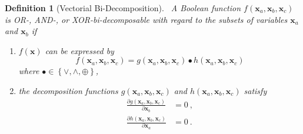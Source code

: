 \documentclass[a4paper]{article}
\newtheorem{definition}{Definition}
\newcommand\bx{\mathbf{x}}
\begin{document}
\begin{definition}[Vectorial Bi-Decomposition]$\, $
\label{def:vbd}
\newline
A Boolean function $f(\bx_a,\bx_b,\bx_c)$
is OR-, AND-, or XOR-bi-decomposable with regard to the subsets of variables $\bx_a$ and $\bx_b$  
if 
\begin{enumerate}
	\item $f(\bx)$ can be expressed by
\begin{equation}
f(\bx_a,\bx_b,\bx_c)=g(\bx_a,\bx_b,\bx_c) \bullet h(\bx_a,\bx_b,\bx_c)
 \label{equ:def_vobd}
\end{equation}
where $\bullet \in \left\{ \vee, \wedge, \oplus \right\}$,
	\item the decomposition functions 
$g(\bx_a,\bx_b,\bx_c)$ and $h(\bx_a,\bx_b,\bx_c)$ satisfy 
\begin{align}
\frac{\partial g(\bx_a,\bx_b,\bx_c)}{\partial \bx_b} &= 0~,
 \label{equ:prop_vbdg}
\\
\frac{\partial h(\bx_a,\bx_b,\bx_c)}{\partial \bx_a} &= 0~.
 \label{equ:prop_vbdh}
\end{align}
\end{enumerate}
\end{definition}
\end{document}
